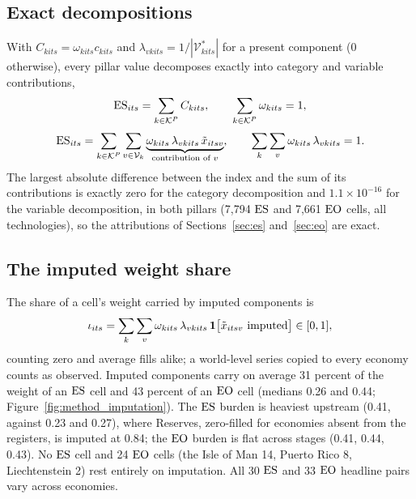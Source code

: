 \subsection{Exact decompositions}\label{subsec:norm_decomposition}

With $C_{kits}=\omega_{kits}c_{kits}$ and $\lambda_{vkits}=1/|\mathcal V^{*}_{kits}|$ for a present
component (0 otherwise), every pillar value decomposes exactly into category and variable
contributions,
\begin{equation}\label{eq:cat_decomp}
  \mathrm{ES}_{its}=\sum_{k\in\mathcal{K}^{P}}C_{kits},\qquad \sum_{k\in\mathcal{K}^{P}}\omega_{kits}=1 ,
\end{equation}
\begin{equation}\label{eq:var_decomp}
  \mathrm{ES}_{its}=\sum_{k\in\mathcal{K}^{P}}\sum_{v\in\mathcal V_{k}}
    \underbrace{\omega_{kits}\,\lambda_{vkits}\,\tilde x_{itsv}}_{\text{contribution of }v},
  \qquad
  \sum_{k}\sum_{v}\omega_{kits}\,\lambda_{vkits}=1 .
\end{equation}
The largest absolute difference between the index and the sum of its contributions is exactly
zero for the category decomposition and $1.1\times10^{-16}$ for the variable decomposition, in
both pillars (7,794 $\mathrm{ES}$ and 7,661 $\mathrm{EO}$ cells, all technologies), so the attributions of
Sections~\ref{sec:es} and~\ref{sec:eo} are exact.

\subsection{The imputed weight share}\label{subsec:norm_diagnostics}

The share of a cell's weight carried by imputed components is
\begin{equation}\label{eq:imputed_share}
  \iota_{its}=\sum_{k}\sum_{v}\omega_{kits}\,\lambda_{vkits}\,
    \mathbf{1}\bigl[\tilde x_{itsv}\text{ imputed}\bigr]\in[0,1],
\end{equation}
counting zero and average fills alike; a world-level series copied to every economy counts as
observed. Imputed components carry on average 31 percent of the weight of an $\mathrm{ES}$ cell and 43
percent of an $\mathrm{EO}$ cell (medians 0.26 and 0.44; Figure~\ref{fig:method_imputation}). The $\mathrm{ES}$
burden is heaviest upstream (0.41, against 0.23 and 0.27), where Reserves, zero-filled for
economies absent from the registers, is imputed at 0.84; the $\mathrm{EO}$ burden is flat across stages
(0.41, 0.44, 0.43). No $\mathrm{ES}$ cell and 24 $\mathrm{EO}$ cells (the Isle of Man 14, Puerto Rico 8,
Liechtenstein 2) rest entirely on imputation. All 30 $\mathrm{ES}$ and 33 $\mathrm{EO}$ headline pairs vary across
economies.

